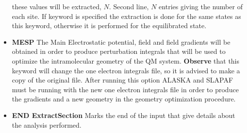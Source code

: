 \begin{keywordlist}
\begin{itemize}
these values will be extracted, $N$. Second line, $N$ entries giving the number
 of each site. If keyword  is specified the extraction is done
for the same states as this keyword, otherwise it is performed for the
equilibrated state.
\item {\bf MESP}
The Main Electrostatic potential, field and field gradients will
be obtained in order to produce perturbation integrals that will
be used to optimize the intramolecular geometry of the QM system.
{\bf Observe} that this keyword will change the one electron integrals file,
so it is advised to make a copy of the original file.
After running this option ALASKA and SLAPAF must be running with the new one
electron integrals file in order to produce the gradients and a new geometry
in the geometry optimization procedure.
\item {\bf END ExtractSection}
Marks the end of the input that give details about the analysis performed.
\end{itemize}

\end{keywordlist}

